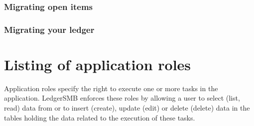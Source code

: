 \subsection{Migrating open items}
\subsection{Migrating your ledger}

\chapter{Listing of application roles}
\label{cha:RolesListing}

Application roles specify the right to execute one or more tasks in the application.
LedgerSMB enforces these roles by allowing a user to select (list, read) data from or to
insert (create), update (edit) or delete (delete) data in the tables holding the data
related to the execution of these tasks.


